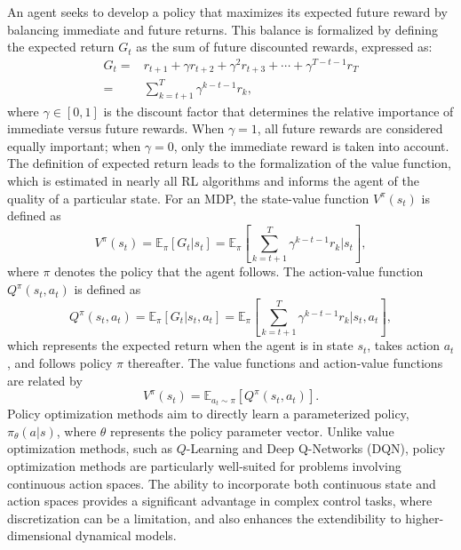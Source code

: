\documentclass[conference]{IEEEtran}
\begin{document}
An agent seeks to develop a policy that maximizes its expected future reward by balancing immediate and future returns. This balance is formalized by defining the expected return \( G_t \) as the sum of future discounted rewards, expressed as:
\begin{align}
    G_t =& r_{t+1} + \gamma r_{t+2} + \gamma^2 r_{t+3} + \cdots + \gamma^{T-t-1} r_T \\=& \sum_{k=t+1}^{T} \gamma^{k-t-1} r_k,
\end{align}
where \( \gamma \in [0, 1] \) is the discount factor that determines the relative importance of immediate versus future rewards. When \( \gamma = 1 \), all future rewards are considered equally important; when \( \gamma = 0 \), only the immediate reward is taken into account. The definition of expected return leads to the formalization of the value function, which is estimated in nearly all RL algorithms and informs the agent of the quality of a particular state. For an MDP, the state-value function \( V^\pi(s_t) \) is defined as
\begin{equation}
	V^\pi(s_t) = \mathbb{E}_\pi \left[ G_t | s_t \right] = \mathbb{E}_\pi \left[ \sum_{k=t+1}^{T} \gamma^{k-t-1} r_k | s_t \right],
\end{equation}	
where \( \pi \) denotes the policy that the agent follows. The action-value function \( Q^\pi(s_t, a_t) \) is defined as
\begin{equation}
	Q^\pi(s_t, a_t) = \mathbb{E}_\pi \left[ G_t | s_t, a_t \right] = \mathbb{E}_\pi \left[ \sum_{k=t+1}^{T} \gamma^{k-t-1} r_k | s_t, a_t \right],
\end{equation}
which represents the expected return when the agent is in state \( s_t \), takes action \( a_t \), and follows policy \( \pi \) thereafter. The value functions and action-value functions are related by
\begin{equation}
	V^\pi(s_t) = \mathbb{E}_{a_t \sim \pi} \left[ Q^\pi(s_t, a_t) \right].
\end{equation}
Policy optimization methods aim to directly learn a parameterized policy, \( \pi_\theta(a | s) \), where \( \theta \) represents the policy parameter vector. Unlike value optimization methods, such as \( Q \)-Learning and Deep Q-Networks (DQN), policy optimization methods are particularly well-suited for problems involving continuous action spaces. The ability to incorporate both continuous state and action spaces provides a significant advantage in complex control tasks, where discretization can be a limitation, and also enhances the extendibility to higher-dimensional dynamical models.
\end{document}
